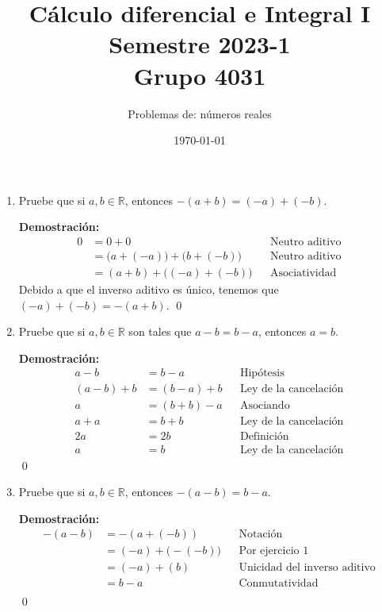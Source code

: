 \documentclass[11pt]{article}
\newcommand{\R}{\mathbb{R}}
\begin{document}
\title{\vspace{-2cm}Cálculo diferencial e Integral I \\ Semestre 2023-1 \\ Grupo 4031}
\author{Problemas de: números reales \\ }
\date{\today}
\maketitle
\thispagestyle{empty}

\begin{enumerate}
\item Pruebe que si $a,b\in \R$, entonces $-(a+b)=(-a)+(-b)$.

\textbf{Demostración:} \begin{align*}
  0 &= 0 + 0 && \text{Neutro aditivo} \\
  &= \bigl(a+(-a)\bigr) + \bigl(b + (-b)\bigr) && \text{Neutro aditivo} \\
  &= (a+b) + \bigl((-a)+ (-b)\bigr) && \text{Asociatividad}
\end{align*}
Debido a que el inverso aditivo es único, tenemos que $(-a)+ (-b)=-(a+b)$.
\qed


\item Pruebe que si $a,b\in \R$ son tales que $a-b=b-a$, entonces $a=b$.

\textbf{Demostración:} \begin{align*}
  a-b &= b- a && \text{Hipótesis} \\
  (a-b)+b &= (b-a)+b &&\text{Ley de la cancelación} \\
  a &= (b+b)-a&&\text{Asociando} \\
  a + a &= b+b &&\text{Ley de la cancelación} \\
  2a &= 2b &&\text{Definición} \\
  a &= b && \text{Ley de la cancelación}
\end{align*} \qed

\item Pruebe que si $a,b\in \R$, entonces $-(a-b)=b-a$.

\textbf{Demostración:} \begin{align*}
  -(a-b) &= -(a+(-b)) &&\text{Notación} \\
  &= (-a) + \bigl(-(-b)\bigr) &&\text{Por ejercicio 1} \\
  &= (-a) + (b) &&\text{Unicidad del inverso aditivo} \\
  &= b -a &&\text{Conmutatividad} \\
\end{align*} \qed


\end{enumerate}
\end{document}
